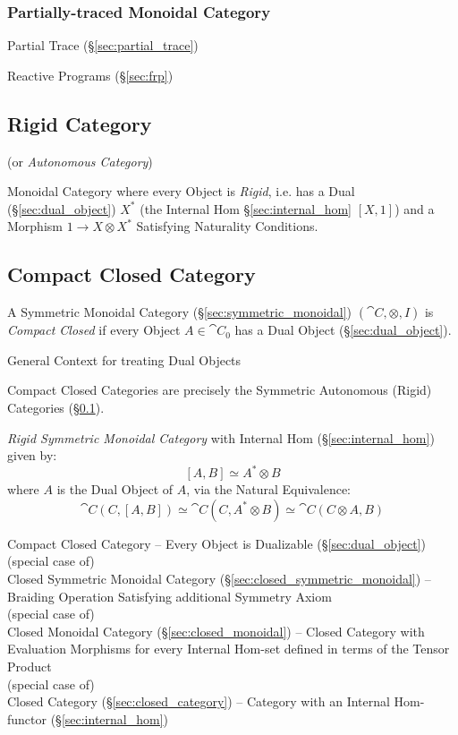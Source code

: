 \subsubsection{Partially-traced Monoidal Category}
\label{sec:partially_traced}

Partial Trace (\S\ref{sec:partial_trace})

Reactive Programs (\S\ref{sec:frp})



\subsection{Rigid Category}\label{sec:rigid_category}

(or \emph{Autonomous Category})

Monoidal Category where every Object is \emph{Rigid}, i.e. has a Dual
(\S\ref{sec:dual_object}) $X^*$ (the Internal Hom
\S\ref{sec:internal_hom} $[X,1]$) and a Morphism $1 \rightarrow
X \otimes X^*$ Satisfying Naturality Conditions.



\subsection{Compact Closed Category}\label{sec:compact_closed}

A Symmetric Monoidal Category (\S\ref{sec:symmetric_monoidal})
$(\cat{C}, \otimes, I)$ is \emph{Compact Closed} if every Object $A
\in \cat{C}_0$ has a Dual Object (\S\ref{sec:dual_object}).

General Context for treating Dual Objects

Compact Closed Categories are precisely the Symmetric Autonomous
(Rigid) Categories (\S\ref{sec:rigid_category}).

\emph{Rigid Symmetric Monoidal Category} with Internal Hom
(\S\ref{sec:internal_hom}) given by:
\[
  [A,B] \simeq A^* \otimes B
\]
where $A$ is the Dual Object of $A$, via the Natural Equivalence:
\[
  \cat{C}(C,[A,B]) \simeq \cat{C}(C,A^* \otimes B)
    \simeq \cat{C}(C \otimes A, B)
\]

Compact Closed Category -- Every Object is Dualizable
(\S\ref{sec:dual_object}) \\
(special case of) \\
Closed Symmetric Monoidal Category
(\S\ref{sec:closed_symmetric_monoidal})
-- Braiding Operation Satisfying additional Symmetry Axiom \\
(special case of) \\
Closed Monoidal Category (\S\ref{sec:closed_monoidal}) -- Closed
Category with Evaluation Morphisms for every Internal Hom-set defined
in terms of the Tensor Product \\
(special case of) \\
Closed Category (\S\ref{sec:closed_category}) -- Category with an
Internal Hom-functor (\S\ref{sec:internal_hom})

